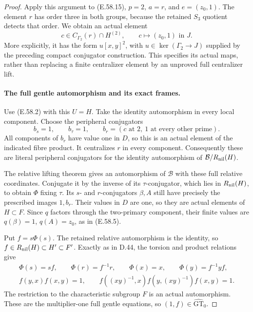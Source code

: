 \begin{proof}
Apply this argument to \textup{(E.58.15)}, \(p=2\),
\(a=r\), and \(e=(z_0,1)\). The element \(r\) has
order three in both groups, because the retained
\(S_3\) quotient detects that order. We obtain an
actual element
\[
 c\in C_{\Gamma_2}(r)\cap H^{(2)},\qquad
 c\longmapsto(z_0,1)\text{ in }J.
 \tag{E.58.19}
\]
More explicitly, it has the form \(u[x,y]^2\), with
\(u\in\ker(\Gamma_2\to J)\) supplied by the preceding
compact conjugator construction. This specifies its
actual maps, rather than replacing a finite centralizer
element by an unproved full centralizer lift.

\paragraph{The full gentle automorphism and its exact frames.}
Use \textup{(E.58.2)} with this \(U=H\). Take the
identity automorphism in every local component. Choose
the peripheral conjugators
\[
 b_s=1,\qquad b_{\tau}=1,\qquad
 b_r=(c\text{ at }2,\ 1\text{ at every other prime}).
 \tag{E.58.20}
\]
All components of \(b_r\) have value one in \(D\),
so this is an actual element of the indicated fibre
product. It centralizes \(r\) in every component.
Consequently these are literal peripheral conjugators
for the identity automorphism of
\(\mathcal B/R_{\rm nil}(H)\).

The relative lifting theorem gives an automorphism of
\(\mathcal B\) with these full relative coordinates.
Conjugate it by the inverse of its \(\tau\)-conjugator,
which lies in \(R_{\rm nil}(H)\), to obtain \(\Phi\)
fixing \(\tau\). Its \(s\)- and \(r\)-conjugators
\(\beta,A\) still have precisely the prescribed
images \(1,b_r\). Their values in \(D\) are one,
so they are actual elements of \(H\subset F\).
Since \(q\) factors through the two-primary component,
their finite values are
\(q(\beta)=1\), \(q(A)=z_0\), as in
\textup{(E.58.5)}.

Put \(f=s\Phi(s)\). The retained relative automorphism
is the identity, so \(f\in R_{\rm nil}(H)\subset H'\subset F'\).
Exactly as in D.44, the torsion and product relations give
\[
 \begin{gathered}
 \Phi(s)=sf,\qquad \Phi(r)=f^{-1}r,\qquad
 \Phi(x)=x,\qquad \Phi(y)=f^{-1}yf,\\
 f(y,x)f(x,y)=1,\qquad
 f((xy)^{-1},x)f(y,(xy)^{-1})f(x,y)=1.
 \end{gathered}
 \tag{E.58.21}
\]
The restriction to the characteristic subgroup \(F\)
is an actual automorphism. These are the multiplier-one
full gentle equations, so \((1,f)\in\widehat{\mathrm{GT}}_0\).


\end{proof}
